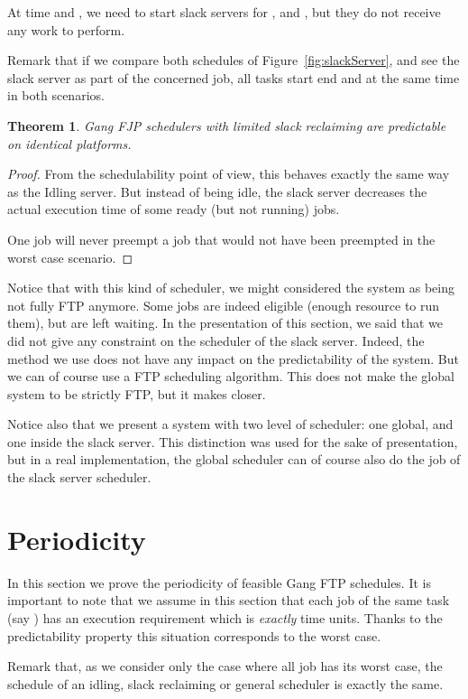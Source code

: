 \documentclass[a4paper]{article}
\newtheorem{theorem}{Theorem}
\begin{document}
At time  and , we need to start slack servers for ,  and , but they do not receive any work to perform.

Remark that if we compare both schedules of Figure~\ref{fig:slackServer}, and see the slack server as part of the concerned job, all tasks start end and at the same time in both scenarios.

\begin{theorem}\label{thm:slack} Gang FJP schedulers with limited slack reclaiming are predictable on identical platforms.
\end{theorem}

\begin{proof}
From the schedulability point of view, this behaves exactly the same way as the Idling server. But instead of being idle, the slack server decreases the actual execution time of some ready (but not running) jobs.

One job will never preempt a job that would not have been preempted in the worst case scenario.
\end{proof}

Notice that with this kind of scheduler, we might considered the system as being not fully FTP anymore. Some jobs are indeed eligible (enough resource to run them), but are left waiting. In the presentation of this section, we said that we did not give any constraint on the scheduler of the slack server. Indeed, the method we use does not have any impact on the predictability of the system. But we can of course use a FTP scheduling algorithm. This does not make the global system to be strictly FTP, but it makes closer.

Notice also that we present a system with two level of scheduler: one global, and one inside the slack server. This distinction was used for the sake of presentation, but in a real implementation, the global scheduler can of course also do the job of the slack server scheduler.

\section{Periodicity}\label{sec:periodicity}
In this section we prove the periodicity of feasible Gang FTP schedules. It is important to note that we assume in this section that each job of the same task (say ) has an execution requirement which is \emph{exactly}  time units. Thanks to the predictability property this situation corresponds to the worst case.

Remark that, as we consider only the case where all job has its worst case, the schedule of an idling, slack reclaiming or general scheduler is exactly the same.
\end{document}
